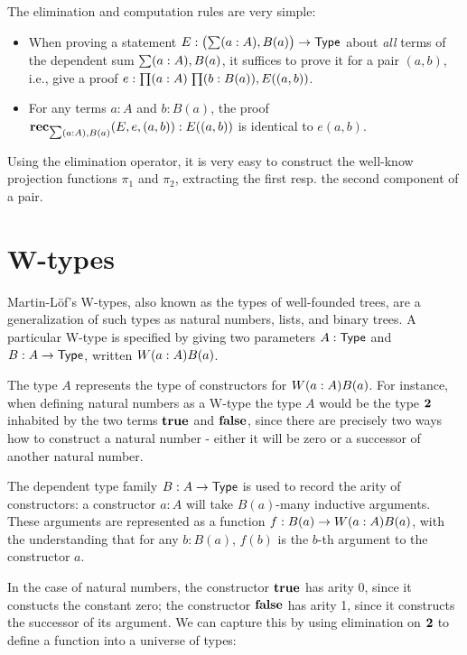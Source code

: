 The elimination and computation rules are very simple:

\begin{itemize}
\item When proving a statement $E : \big(\sm{a:A} B(a)\big) \to \type$ about \emph{all} terms of the dependent sum $\sm{a:A} B(a)$, it suffices to prove it for a pair $(a,b)$, i.e., give a proof $e : \prd{a:A}{b:B(a)} E((a,b))$.
\end{itemize}

\begin{itemize}
\item For any terms $a : A$ and $b : B(a)$, the proof $\rec_{\sm{a:A} B(a)}(E,e,(a,b)) : E((a,b))$ is identical to $e(a,b)$.
\end{itemize}
Using the elimination operator, it is very easy to construct the well-know projection functions $\pi_1$ and $\pi_2$, extracting the first resp. the second component of a pair.

\section{W-types}
Martin-L{\"o}f's W-types, also known as the types of well-founded trees, are a generalization of such types as natural numbers, lists, and binary trees. A particular W-type is specified by giving two parameters $A : \mathsf{Type}$ and $B : A \to \mathsf{Type}$, written $W(a:A) B(a)$.

The type $A$ represents the type of constructors for $W(a :A) B(a)$. For instance, when defining natural numbers as a W-type the type $A$ would be the type $\mathbf{2}$ inhabited by the two terms $\mathbf{true}$ and $\mathbf{false}$, since there are precisely two ways how to construct a natural number - either it will be zero or a successor of another natural number. 

The dependent type family $B : A \to \mathsf{Type}$ is used to record the arity of constructors: a constructor $a : A$ will take $B(a)$-many inductive arguments. These arguments are represented as a function $f : B(a) \to W(a :A) B(a)$, with the understanding that for any $b : B(a)$, $f(b)$ is the $b$-th argument to the constructor $a$. 

In the case of natural numbers, the constructor $\mathbf{true} $ has arity 0, since it constucts the constant zero; the constructor $\mathbf{false}$ has arity 1, since it constructs the successor of its argument. We can capture this by using elimination on $\mathbf{2}$ to define a function into a universe of types:

